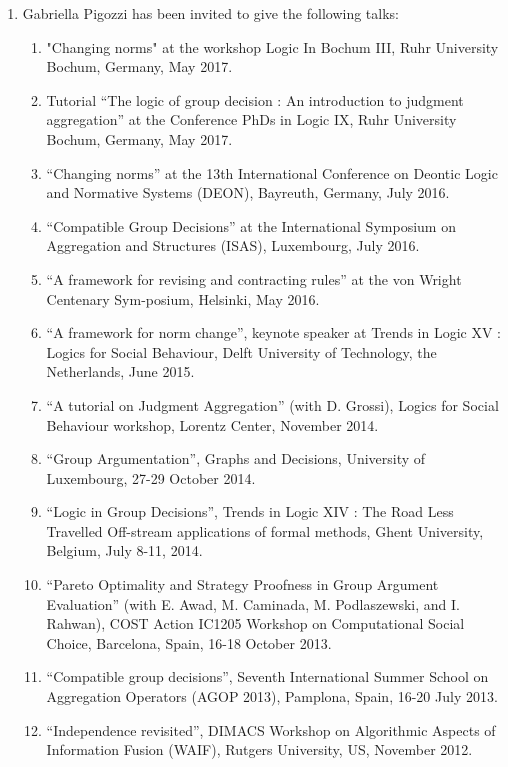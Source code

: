 \documentclass[version=last, pagesize, twoside=semi, DIV=calc, 12pt, a4paper, french, english, bibliography=totoc]{scrartcl}
\begin{document}
\begin{enumerate}
\item Gabriella Pigozzi has been invited to give the following talks: \begin{enumerate} \item "Changing norms" at the workshop Logic In Bochum III, Ruhr University Bochum, Germany, May 2017.
\item  Tutorial “The logic of group decision : An introduction to judgment aggregation” at the Conference PhDs in Logic IX, Ruhr University Bochum, Germany, May 2017.
\item  “Changing norms” at the 13th International Conference on Deontic Logic and Normative Systems (DEON), Bayreuth, Germany, July 2016.
\item   “Compatible Group Decisions” at the International Symposium on Aggregation and Structures (ISAS), Luxembourg, July 2016.
\item  “A framework for revising and contracting rules” at the von Wright Centenary Sym-posium, Helsinki, May 2016.
\item  “A framework for norm change”, keynote speaker at Trends in Logic XV : Logics for Social Behaviour, Delft University of Technology, the Netherlands, June 2015.
\item  “A tutorial on Judgment Aggregation” (with D. Grossi), Logics for Social Behaviour workshop, Lorentz Center, November 2014.
\item   “Group Argumentation”, Graphs and Decisions, University of Luxembourg, 27-29 October 2014.
\item  “Logic in Group Decisions”, Trends in Logic XIV : The Road Less Travelled Oﬀ-stream applications of formal methods, Ghent University, Belgium, July 8-11, 2014. 
\item  “Pareto Optimality and Strategy Proofness in Group Argument Evaluation” (with E. Awad, M. Caminada, M. Podlaszewski, and I. Rahwan), COST Action IC1205 Workshop on Computational Social Choice, Barcelona, Spain, 16-18 October 2013.
\item  “Compatible group decisions”, Seventh International Summer School on Aggregation Operators (AGOP 2013), Pamplona, Spain, 16-20 July 2013.
\item  “Independence revisited”, DIMACS Workshop on Algorithmic Aspects of Information Fusion (WAIF), Rutgers University, US, November 2012.

\end{enumerate}
\end{enumerate}
\end{document}
